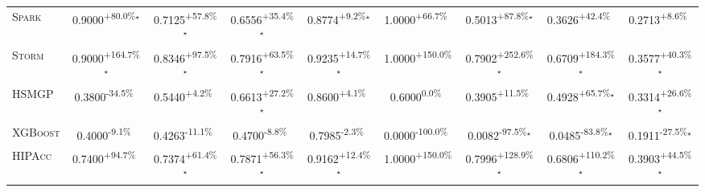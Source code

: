 \begin{table}[htbp]
\begin{tabular}{l|cccc|cccc}
\textsc{Spark} & \cellcolor{green!30}0.9000\textsuperscript{+80.0\%}$^\star$ & \cellcolor{green!30}0.7125\textsuperscript{+57.8\%}$^\star$ & \cellcolor{green!30}0.6556\textsuperscript{+35.4\%}$^\star$ & \cellcolor{green!30}0.8774\textsuperscript{+9.2\%}$^\star$ & \cellcolor{green!30}1.0000\textsuperscript{+66.7\%}$^{\,\,\,}$ & \cellcolor{green!30}0.5013\textsuperscript{+87.8\%}$^\star$ & \cellcolor{green!30}0.3626\textsuperscript{+42.4\%}$^{\,\,\,}$ & \cellcolor{green!30}0.2713\textsuperscript{+8.6\%}$^{\,\,\,}$ \\
\textsc{Storm} & \cellcolor{green!30}0.9000\textsuperscript{+164.7\%}$^\star$ & \cellcolor{green!30}0.8346\textsuperscript{+97.5\%}$^\star$ & \cellcolor{green!30}0.7916\textsuperscript{+63.5\%}$^\star$ & \cellcolor{green!30}0.9235\textsuperscript{+14.7\%}$^\star$ & \cellcolor{green!30}1.0000\textsuperscript{+150.0\%}$^{\,\,\,}$ & \cellcolor{green!30}0.7902\textsuperscript{+252.6\%}$^\star$ & \cellcolor{green!30}0.6709\textsuperscript{+184.3\%}$^\star$ & \cellcolor{green!30}0.3577\textsuperscript{+40.3\%}$^\star$ \\
\textsc{HSMGP} & \cellcolor{red!30}0.3800\textsuperscript{-34.5\%}$^{\,\,\,}$ & \cellcolor{green!30}0.5440\textsuperscript{+4.2\%}$^{\,\,\,}$ & \cellcolor{green!30}0.6613\textsuperscript{+27.2\%}$^\star$ & \cellcolor{green!30}0.8600\textsuperscript{+4.1\%}$^{\,\,\,}$ & \cellcolor{red!30}0.6000\textsuperscript{0.0\%}$^{\,\,\,}$ & \cellcolor{green!30}0.3905\textsuperscript{+11.5\%}$^{\,\,\,}$ & \cellcolor{green!30}0.4928\textsuperscript{+65.7\%}$^\star$ & \cellcolor{green!30}0.3314\textsuperscript{+26.6\%}$^\star$ \\
\textsc{XGBoost} & \cellcolor{red!30}0.4000\textsuperscript{-9.1\%}$^{\,\,\,}$ & \cellcolor{red!30}0.4263\textsuperscript{-11.1\%}$^{\,\,\,}$ & \cellcolor{red!30}0.4700\textsuperscript{-8.8\%}$^{\,\,\,}$ & \cellcolor{red!30}0.7985\textsuperscript{-2.3\%}$^{\,\,\,}$ & \cellcolor{red!30}0.0000\textsuperscript{-100.0\%}$^{\,\,\,}$ & \cellcolor{red!30}0.0082\textsuperscript{-97.5\%}$^\star$ & \cellcolor{red!30}0.0485\textsuperscript{-83.8\%}$^\star$ & \cellcolor{red!30}0.1911\textsuperscript{-27.5\%}$^\star$ \\
\textsc{HIPAcc} & \cellcolor{green!30}0.7400\textsuperscript{+94.7\%}$^{\,\,\,}$ & \cellcolor{green!30}0.7374\textsuperscript{+61.4\%}$^\star$ & \cellcolor{green!30}0.7871\textsuperscript{+56.3\%}$^\star$ & \cellcolor{green!30}0.9162\textsuperscript{+12.4\%}$^\star$ & \cellcolor{green!30}1.0000\textsuperscript{+150.0\%}$^{\,\,\,}$ & \cellcolor{green!30}0.7996\textsuperscript{+128.9\%}$^\star$ & \cellcolor{green!30}0.6806\textsuperscript{+110.2\%}$^\star$ & \cellcolor{green!30}0.3903\textsuperscript{+44.5\%}$^\star$ \\

\end{tabular}
\end{table}
